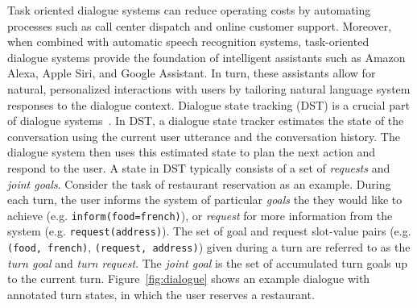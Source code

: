 \documentclass[11pt,a4paper]{article}
\begin{document}
Task oriented dialogue systems can reduce operating costs by automating processes such as call center dispatch and online customer support.
Moreover, when combined with automatic speech recognition systems, task-oriented dialogue systems provide the foundation of intelligent assistants such as Amazon Alexa, Apple Siri, and Google Assistant.
In turn, these assistants allow for natural, personalized interactions with users by tailoring natural language system responses to the dialogue context.
Dialogue state tracking (DST) is a crucial part of dialogue systems~\citep{young2013POMDPDialogueReview}.
In DST, a dialogue state tracker estimates the state of the conversation using the current user utterance and the conversation history.
The dialogue system then uses this estimated state to plan the next action and respond to the user.
A state in DST typically consists of a set of \textit{requests} and \textit{joint goals}.
Consider the task of restaurant reservation as an example.
During each turn, the user informs the system of particular \textit{goals} the they would like to achieve (e.g. \texttt{inform(food=french)}), or \textit{request} for more information from the system (e.g. \texttt{request(address)}).
The set of goal and request slot-value pairs (e.g. \texttt{(food, french)}, \texttt{(request, address)}) given during a turn are referred to as the \textit{turn goal} and \textit{turn request}.
The \textit{joint goal} is the set of accumulated turn goals up to the current turn.
Figure~\ref{fig:dialogue} shows an example dialogue with annotated turn states, in which the user reserves a restaurant.
\end{document}
